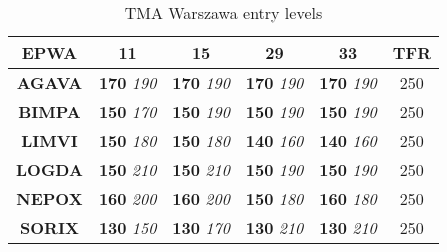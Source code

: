
\begin{table}[htbp]
  \centering
  \begin{tabular}{|c|c|c|c|c|c|}
    \hline
    \rowcolor{vred}\color{white}
    \textbf{EPWA}&\color{white}\textbf{11}&\color{white}\textbf{15}&\color{white}\textbf{29}&\color{white}\textbf{33}&\color{white}\textbf{TFR}\\\hline
    \textbf{AGAVA} & \textbf{170} \textit{190} & \textbf{170} \textit{190} & \textbf{170} \textit{190} & \textbf{170} \textit{190} & 250\\\hline
    \textbf{BIMPA} & \textbf{150} \textit{170} & \textbf{150} \textit{190} & \textbf{150} \textit{190} & \textbf{150} \textit{190} & 250\\\hline
    \textbf{LIMVI} & \textbf{150} \textit{180} & \textbf{150} \textit{180} & \textbf{140} \textit{160} & \textbf{140} \textit{160} & 250\\\hline
    \textbf{LOGDA} & \textbf{150} \textit{210} & \textbf{150} \textit{210} & \textbf{150} \textit{190} & \textbf{150} \textit{190} & 250\\\hline
    \textbf{NEPOX} & \textbf{160} \textit{200} & \textbf{160} \textit{200} & \textbf{150} \textit{180} & \textbf{160} \textit{180} & 250\\\hline
    \textbf{SORIX} & \textbf{130} \textit{150} & \textbf{130} \textit{170} & \textbf{130} \textit{210} & \textbf{130} \textit{210} & 250\\\hline
  \end{tabular}
  \caption{TMA Warszawa entry levels}
  \label{tab:coordination:Warszawa:entry}
\end{table}

